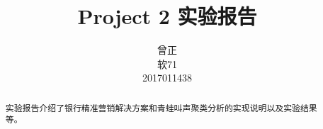 \documentclass{acm_proc_article-sp}
\begin{document}
\title{Project 2 实验报告}
%
%
%
%
%

%
\author{
%
%
\alignauthor
曾正 \\
软71 \\
2017011438
}


\maketitle
\begin{abstract}
实验报告介绍了银行精准营销解决方案和青蛙叫声聚类分析的实现说明以及实验结果等。
\end{abstract}
\end{document}
